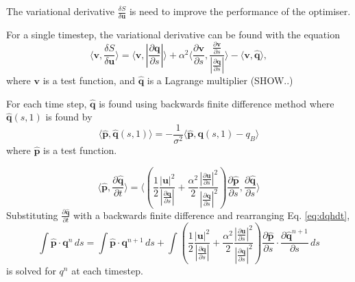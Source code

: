 \documentclass[a4paper, 10pt]{article}
\newcommand{\eq}[1]{Eq. \ref{eq:#1}}
\newcommand{\vect}[1]{\ensuremath{\mathbf{#1}}}
\newcommand{\hvect}[1]{\ensuremath{\hat{\vect{#1}}}}
\begin{document}
The variational derivative $\frac{\delta S}{\delta \vect u}$ is need to improve
the performance of the optimiser. 

For a single timestep, the variational derivative can be found with the equation
\begin{equation}
  \label{eq:dsdu}
  \langle \vect v, \frac{\delta S}{\delta \vect u}\rangle =
  \langle \vect v, \left| \frac{\partial \vect q}{\partial s}\right |\rangle 
  + \alpha^2 \langle \frac{\partial \vect v}{\partial s},
  \frac{\frac{\partial \vect v}{\partial s} }{ \left|\frac{\partial \vect q}{\partial s}\right|}
\rangle - \langle \vect v, \hvect{q} \rangle,
\end{equation}
where $\vect v$ is a test function, and $\hvect q$ is a Lagrange multiplier (SHOW..)

For each time step, $\hvect q$ is found using backwards finite difference method
where $\hvect q(s,1)$ is found by
\begin{equation}
  \label{eq:qh1}
  \langle \hvect p, \hvect q(s,1) \rangle = - \frac{1}{\sigma^2}
  \langle \hvect p, \vect q(s,1) - q_B \rangle
\end{equation}
where $\hvect p$ is a test function.


\begin{equation}
  \label{eq:dqhdt}
  \langle \hvect p, \frac{\partial \hvect q}{\partial t} \rangle =
  \langle
  \left( 
    \frac{1}{2}
    \frac{ 
      \left| \vect u \right|^2}{
      \left| \frac{\partial \vect q}{\partial s}\right|}
    +
    \frac{\alpha^2}{2}
    \frac{ 
      \left| \frac{\partial \vect u}{\partial s}\right|^2}{
      \left| \frac{\partial \vect q}{\partial s}\right|^2}
  \right)\frac{\partial \hvect p}{\partial s}, \frac{\partial \hvect q}{\partial s} \rangle
\end{equation}
Substituting $\frac{\partial \hvect q}{\partial t}$ with a backwards finite difference and
rearranging \eq{dqhdt},
\begin{equation}
  \label{eq:fd_qh}
  \int \hvect p \cdot \vect q^n \,ds = \int \hvect p \cdot \vect q^{n+1} \,ds
  + \int
   \left( 
    \frac{1}{2}
    \frac{ 
      \left| \vect u \right|^2}{
      \left| \frac{\partial \vect q}{\partial s}\right|}
    +
    \frac{\alpha^2}{2}
    \frac{ 
      \left| \frac{\partial \vect u}{\partial s}\right|^2}{
      \left| \frac{\partial \vect q}{\partial s}\right|^2}
  \right) \frac{ \partial \hvect p}{\partial s} 
  \cdot \frac{\partial \hvect q^{n+1}}{\partial s}\,ds
\end{equation}
is solved for $q^n$ at each timestep.
\end{document}
